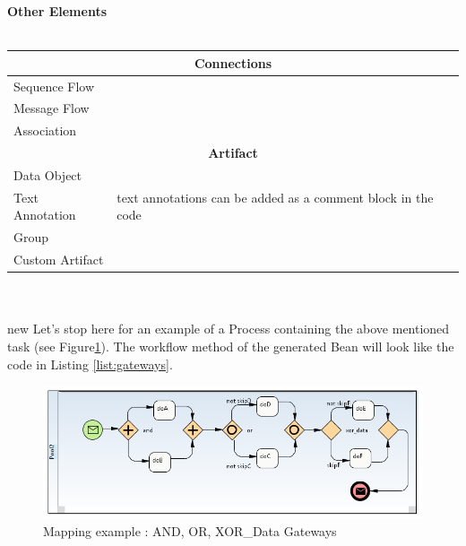	\textbf{\Large{Other Elements}}\\\\
		\begin{tabularx}{\linewidth}{|l|X|}\hline\hline
		\multicolumn{2}{|c|}{\textbf{Connections}}\\\hline\hline
		Sequence Flow & \\\hline
		Message Flow& \\\hline
		Association & \\\hline\hline
		\multicolumn{2}{|c|}{\textbf{Artifact}}\\\hline\hline
		Data Object & \\\hline
		Text Annotation & text annotations can be added as a comment block in the code \\\hline
		Group & \\\hline
		Custom Artifact & \\\hline
		\end{tabularx}\\\\
		
		
		
		
new
Let's stop here for an example of a Process containing the above mentioned task (see Figure\ref{fig:gateways}). 
The workflow method of the generated Bean will look like the code in Listing \ref{list:gateways}.
\begin{figure}[h]
	\centering
		\includegraphics[width=1.0\textwidth]{images/mapping/gateways.png}
	\caption{Mapping example : AND, OR, XOR\_Data Gateways}
	\label{fig:gateways}
\end{figure}

